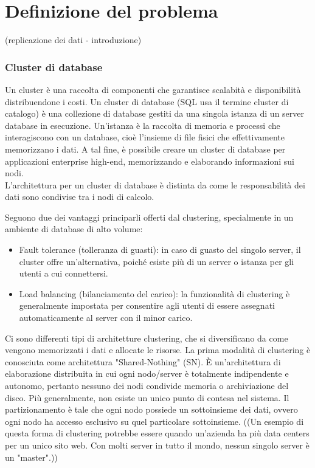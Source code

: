 %
\chapter{Definizione del problema}
\setcounter{section}{1}
(replicazione dei dati - introduzione)
\item
\subsection{Cluster di database}
Un cluster \`{e} una raccolta di componenti che garantisce scalabit\`{a} e disponibilit\`{a} distribuendone i costi. Un cluster di database (SQL usa il termine cluster di catalogo) \`{e} una collezione di database gestiti da una singola istanza di un server database in esecuzione. Un'istanza \`{e} la raccolta di memoria e processi che interagiscono con un database, cio\`{e} l'insieme di file fisici che effettivamente memorizzano i dati.\cite{etichetta1} A tal fine, \`{e} possibile creare un cluster di database per applicazioni enterprise high-end, memorizzando e elaborando informazioni sui nodi.\\ L'architettura per un cluster di database \`{e} distinta da come le responsabilit\`{a} dei dati sono condivise tra i nodi di calcolo.

Seguono due dei vantaggi principarli offerti dal clustering, specialmente in un ambiente di database di alto volume:
\begin{itemize}
\item 
Fault tolerance (tolleranza di guasti): in caso di guasto del singolo server, il cluster offre un'alternativa, poich\'{e} esiste pi\`{u} di un server o istanza per gli utenti a cui connettersi.
\item
Load balancing (bilanciamento del carico): la funzionalit\`{a} di clustering \`{e} generalmente impostata per consentire agli utenti di essere assegnati automaticamente al server con il minor carico.\cite{etichetta1} 
\end{itemize}
Ci sono differenti tipi di architetture clustering, che si diversificano da come vengono memorizzati i dati e allocate le risorse.
La prima modalit\`{a} di clustering \`{e} conosciuta come architettura "Shared-Nothing" (SN). \`{E} un'architettura di elaborazione distribuita in cui ogni nodo/server \`{e} totalmente indipendente e autonomo, pertanto nessuno dei nodi condivide memoria o archiviazione del disco. Pi\`{u} generalmente, non esiste un unico punto di contesa nel sistema.\cite{etichetta5} Il partizionamento \`{e} tale che ogni nodo possiede un sottoinsieme dei dati, ovvero ogni nodo ha accesso esclusivo su quel particolare sottoinsieme. 
((Un esempio di questa forma di clustering potrebbe essere quando un'azienda ha pi\`{u} data centers per un unico sito web. Con molti server in tutto il mondo, nessun singolo server \`{e} un "master".\cite{etichetta2}))\\

